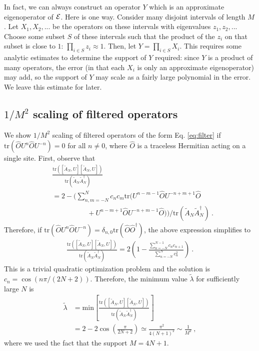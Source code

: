 \documentclass[twocolumn,superscriptaddress, prl,showpacs]{revtex4-1}
\begin{document}
In fact, we can always construct an operator $Y$ which is an approximate eigenoperator of ${\cal E}$.  Here is one way.  Consider many disjoint intervals of length $M$.  Let $X_1,X_2,...$ be the operators on these intervals with eigenvalues $z_1,z_2,...$  Choose some subset $S$ of these intervals such that the product of the $z_i$ on that subset is close to $1$: $\prod_{i \in S} z_i \approx 1$.  Then, let $Y=\prod_{i \in S} X_i$.  This requires some analytic estimates to determine the support of $Y$ required: since $Y$ is a product of many operators, the error (in that each $X_i$ is only an approximate eigenoperator) may add, so the support of $Y$ may scale as a fairly large polynomial in the error.  We leave this estimate for later.

\subsection{$1/M^2$ scaling of filtered operators}
We show $1/M^2$ scaling of filtered operators of the form Eq. \eqref{eq:filter} if $\mathrm{tr}(\hat{O}U^n \hat{O}U^{-n}) = 0$ for all $n\neq 0$,
where $\hat{O}$ is a traceless Hermitian acting on a single site.
First, observe that
\begin{align}
& \frac{\mathrm{tr}([\tilde{A}_N,U][\tilde{A}_N,U])}{\mathrm{tr}(\tilde{A}_N\tilde{A}_N^\dag)} \nonumber\\
&=2 - \bigg(\sum_{n,m = -N}^{N}c_n c_m \mathrm{tr}(U^{n-m-1}\hat{O}U^{-n+m+1}\hat{O} \nonumber\\
&\quad\quad\quad\quad\quad + U^{n-m+1}\hat{O}U^{-n+m-1}\hat{O})\bigg)/\mathrm{tr}(\tilde{A}_N\tilde{A}_N^\dag) ~.
\end{align}
Therefore, if $\mathrm{tr}(\hat{O}U^n \hat{O}U^{-n}) = \delta_{n,0}\mathrm{tr}(\hat{O}\hat{O}^\dag)$,
the above expression simplifies to
\begin{align}
\frac{\mathrm{tr}([\tilde{A}_N,U][\tilde{A}_N,U])}{\mathrm{tr}(\tilde{A}_N\tilde{A}_N^\dag)}=2\left(1 - \frac{\sum_{n=-N}^{N-1}c_n c_{n+1}}{\sum_{n=-N}^N c_n^2}\right) ~.
\end{align}
This is a trivial quadratic optimization problem and the solution is $c_n = \cos(n\pi/(2N+2))$.
Therefore, the minimum value $\tilde{\lambda}$ for sufficiently large $N$ is
\begin{align}
\tilde{\lambda} &= \mathrm{min}\left[\frac{\mathrm{tr}([\tilde{A}_N,U][\tilde{A}_N,U])}{\mathrm{tr}(\tilde{A}_N\tilde{A}_N^\dag)} \right] \nonumber\\
&= 2 - 2\cos\left(\frac{\pi}{2N+2}\right) \simeq \frac{\pi^2}{4(N+1)^2} \sim \frac{1}{M^2} ~,
\end{align}
where we used the fact that the support $M = 4N +1 $.
\end{document}
